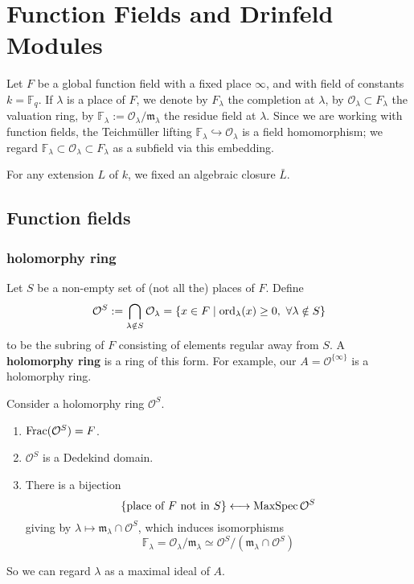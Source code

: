 \documentclass{article}
\newcommand{\F}{\mathbb{F}}
\renewcommand{\O}{\mathcal{O}}
\newcommand{\m}{\mathfrak{m}}
\begin{document}
\section{Function Fields and Drinfeld Modules}
Let $F$ be a global function field with a fixed place $\infty$, and with field of constants $k = \F_q$.
If $\lambda$ is a place of $F$,
we denote by $F_\lambda$ the completion at $\lambda$,  by $\O_\lambda\subset F_\lambda$ the valuation ring,
by $\F_\lambda := \O_\lambda/\m_\lambda$ the residue field at $\lambda$.
Since we are working with function fields, the Teichm\"uller lifting $\F_\lambda\hookrightarrow \O_\lambda$ is a field homomorphism;
we regard $\F_\lambda\subset\O_\lambda\subset F_\lambda$ as a subfield via this embedding.


For any extension $L$ of $k$, we fixed an algebraic closure $\bar{L}$.

\subsection{Function fields}

\subsubsection{holomorphy ring}
Let $S$ be a non-empty set of (not all the) places of $F$.
Define \[\O^S := \bigcap_{\lambda\notin S} \O_\lambda = \{x\in F\mid \ord_\lambda(x)\ge 0,\ \forall\lambda\notin S\}\]
to be the subring of $F$ consisting of elements regular away from $S$.
A \textbf{holomorphy ring} is a ring of this form.
For example, our $A = \O^{\{\infty\}}$ is a holomorphy ring.

\begin{proposition}
Consider a holomorphy ring $\O^S$.
\begin{enumerate}[(1)]
    \item $\Frac(\O^S) = F$.
    \item $\O^S$ is a Dedekind domain.
    \item There is a bijection \[\{\text{place of }F\text{ not in }S\}\longleftrightarrow \spm \O^S\] giving by $\lambda\mapsto \m_\lambda\cap\O^S$, which induces isomorphisms \[\F_\lambda = \O_\lambda/\m_\lambda\simeq \O^S/(\m_\lambda\cap\O^S)\]
\end{enumerate}
\end{proposition}
So we can regard $\lambda$ as a maximal ideal of $A$.
\end{document}
